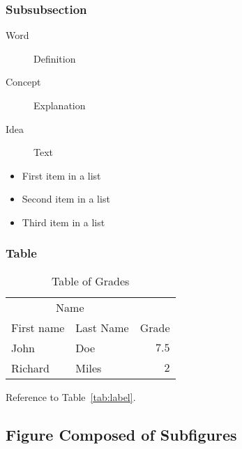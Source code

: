 \documentclass[
10pt, %
a4paper, %
oneside, %
headinclude,footinclude, %
BCOR5mm, %
]{scrartcl}
\begin{document}
\lipsum[11] %

\subsubsection{Subsubsection}

\lipsum[12] %

\begin{description}
\item[Word] Definition
\item[Concept] Explanation
\item[Idea] Text
\end{description}

\lipsum[12] %

\begin{itemize}[noitemsep] %
\item First item in a list
\item Second item in a list
\item Third item in a list
\end{itemize}

\subsubsection{Table}

\lipsum[13] %

\begin{table}[hbt]
\caption{Table of Grades}
\centering
\begin{tabular}{llr}
\toprule
\multicolumn{2}{c}{Name} \\
\cmidrule(r){1-2}
First name & Last Name & Grade \\
\midrule
John & Doe & $7.5$ \\
Richard & Miles & $2$ \\
\bottomrule
\end{tabular}
\label{tab:label}
\end{table}

Reference to Table~\vref{tab:label}. %


\subsection{Figure Composed of Subfigures}
\end{document}
